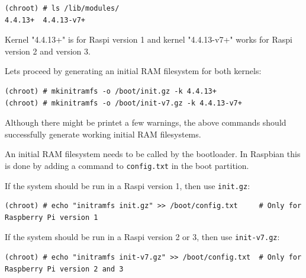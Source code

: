 \begin{lstlisting}[]
(chroot) # ls /lib/modules/
4.4.13+  4.4.13-v7+
\end{lstlisting}
\FloatBarrier
\vspace{-5mm}

Kernel "4.4.13+" is for \ac{Raspi} version 1 and kernel "4.4.13-v7+" works
for \ac{Raspi} version 2 and version 3.

Lets proceed by generating an initial \ac{RAM} filesystem for both kernels:



\begin{lstlisting}[]
(chroot) # mkinitramfs -o /boot/init.gz -k 4.4.13+
(chroot) # mkinitramfs -o /boot/init-v7.gz -k 4.4.13-v7+
\end{lstlisting}
\FloatBarrier
\vspace{-5mm}


Although there might be printet a few warnings, the above commands should successfully
generate working initial \ac{RAM} filesystems. 

An initial \ac{RAM} filesystem needs to be called by the bootloader. In Raspbian
this is done by adding a command to \texttt{config.txt} in the boot partition.

If the system should be run in a \ac{Raspi} version 1, then use \texttt{init.gz}:
\begin{lstlisting}[]
(chroot) # echo "initramfs init.gz" >> /boot/config.txt     # Only for Raspberry Pi version 1
\end{lstlisting}
\FloatBarrier
\vspace{-5mm}

If the system should be run in a \ac{Raspi} version 2 or 3, then use \texttt{init-v7.gz}:
\begin{lstlisting}[]
(chroot) # echo "initramfs init-v7.gz" >> /boot/config.txt  # Only for Raspberry Pi version 2 and 3
\end{lstlisting}
\FloatBarrier
\vspace{-5mm}

